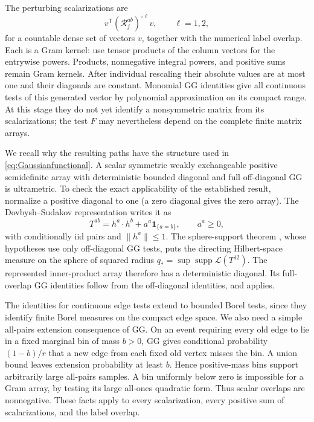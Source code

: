 \documentclass[11pt]{article}
\numberwithin{equation}{section}
\theoremstyle{definition}
\newcommand{\supp}{\operatorname{supp}}
\newcommand{\norm}[1]{\lVert #1\rVert}
\newcommand{\one}{\mathbf 1}
\begin{document}
The perturbing scalarizations are
\begin{equation}\label{eq:scalarizations}
v^{\mathsf T}(\mathcal R_j^{ab})^{\circ \ell}v,
\qquad \ell=1,2,
\end{equation}
for a countable dense set of vectors $v$, together with the numerical label overlap. Each is a Gram kernel: use tensor products of the column vectors for the entrywise powers. Products, nonnegative integral powers, and positive sums remain Gram kernels. After individual rescaling their absolute values are at most one and their diagonals are constant. Monomial GG identities give all continuous tests of this generated vector by polynomial approximation on its compact range. At this stage they do not yet identify a nonsymmetric matrix from its scalarizations; the test $F$ may nevertheless depend on the complete finite matrix arrays.

We recall why the resulting paths have the structure used in \eqref{eq:Gaussianfunctional}. A scalar symmetric weakly exchangeable positive semidefinite array with deterministic bounded diagonal and full off-diagonal GG is ultrametric. To check the exact applicability of the established result, normalize a positive diagonal to one (a zero diagonal gives the zero array). The Dovbysh--Sudakov representation \cite[Proposition~1]{PanDS} writes it as
\[
T^{ab}=h^a\cdot h^b+a^a\one_{\{a=b\}},\qquad a^a\ge0,
\]
with conditionally iid pairs and $\norm{h^a}\le1$. The sphere-support theorem \cite[Theorem~2(a)]{PanSupport}, whose hypotheses use only off-diagonal GG tests, puts the directing Hilbert-space measure on the sphere of squared radius $q_*=\sup\supp\mathcal L(T^{12})$. The represented inner-product array therefore has a deterministic diagonal. Its full-overlap GG identities follow from the off-diagonal identities, and \cite[Theorem~1]{PanUltrametric} applies.

The identities for continuous edge tests extend to bounded Borel tests, since they identify finite Borel measures on the compact edge space. We also need a simple all-pairs extension consequence of GG. On an event requiring every old edge to lie in a fixed marginal bin of mass $b>0$, GG gives conditional probability $(1-b)/r$ that a new edge from each fixed old vertex misses the bin. A union bound leaves extension probability at least $b$. Hence positive-mass bins support arbitrarily large all-pairs samples. A bin uniformly below zero is impossible for a Gram array, by testing its large all-ones quadratic form. Thus scalar overlaps are nonnegative. These facts apply to every scalarization, every positive sum of scalarizations, and the label overlap.
\end{document}
